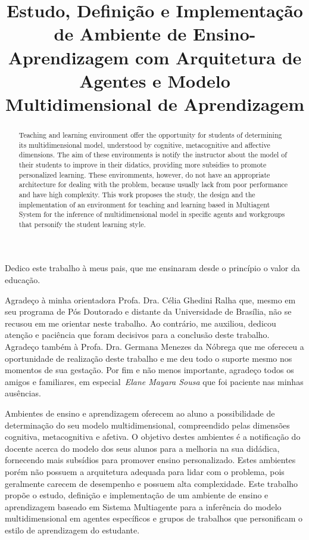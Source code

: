 \documentclass[bacharelado]{unb-cic}
\title{Estudo, Definição e Implementação de Ambiente de Ensino-Aprendizagem com Arquitetura de Agentes e Modelo Multidimensional de Aprendizagem}
\begin{document}
  \maketitle

  \begin{dedicatoria}
  Dedico este trabalho à meus pais, que me ensinaram desde o princípio o valor da educação.
  \end{dedicatoria}

  \begin{agradecimentos}
  Agradeço à minha orientadora Profa. Dra. Célia Ghedini Ralha que, mesmo em seu programa de Pós Doutorado e distante da Universidade de Brasília, não se recusou em me orientar neste trabalho. Ao contrário, me auxiliou, dedicou atenção e paciência que foram decisivos para a conclusão deste trabalho.
  Agradeço também à Profa. Dra. Germana Menezes da Nóbrega que me ofereceu a oportunidade de realização deste trabalho e me deu todo o suporte mesmo nos momentos de sua gestação.
  Por fim e não menos importante, agradeço todos os amigos e familiares, em especial~\emph{Elane Mayara Sousa} que foi paciente nas minhas ausências.
  \end{agradecimentos}

  \begin{resumo}
  Ambientes de ensino e aprendizagem oferecem ao aluno a possibilidade de determinação do seu modelo multidimensional, compreendido pelas dimensões cognitiva, metacognitiva e afetiva. O objetivo destes ambientes é a notificação do docente acerca do modelo dos seus alunos para a melhoria na sua didádica, fornecendo mais subsídios para promover ensino personalizado. Estes ambientes porém não possuem a arquitetura adequada para lidar com o problema, pois geralmente carecem de desempenho e possuem alta complexidade. 
  Este trabalho propõe o estudo, definição e implementação de um ambiente de ensino e aprendizagem baseado em Sistema Multiagente para a inferência do modelo multidimensional em agentes específicos e grupos de trabalhos que personificam o estilo de aprendizagem do estudante.
  \end{resumo}

  \begin{abstract}
  Teaching and learning environment offer the opportunity for students of determining its multidimensional model, understood by cognitive, metacognitive and affective dimensions. The aim of these environments is notify the instructor about the model of their students to improve in their didatics, providing more subsidies to promote personalized learning. These enviromments, however, do not have an appropriate architecture for dealing with the problem, because usually lack from poor performance and have high complexity.
  This work proposes the study, the design and the implementation of an environment for teaching and learning based in Multiagent System for the inference of multidimensional model in specific agents and workgroups that personify the student learning style.
  \end{abstract}
\end{document}
